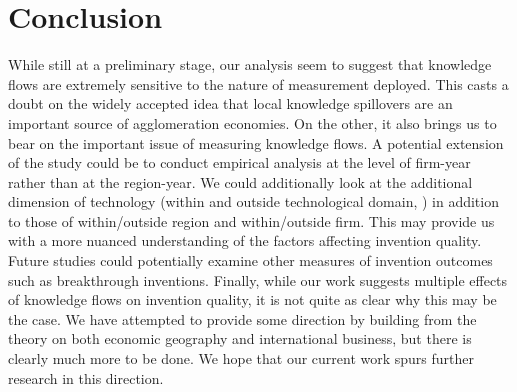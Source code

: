 \documentclass[12pt,letterpaper]{article}
\begin{document}
\section*{Conclusion}
While still at a preliminary stage, our analysis seem to suggest that knowledge flows are extremely sensitive to the nature of measurement deployed. This casts a doubt on the widely accepted idea that local knowledge spillovers are an important source of agglomeration economies. On the other, it also brings us to bear on the important issue of measuring knowledge flows. A potential extension of the study could be to conduct empirical analysis at the level of firm-year rather than at the region-year. We could additionally look at the additional dimension of technology (within and outside technological domain, \cite{Rosenkopf2001}) in addition to those of within/outside region and within/outside firm. This may provide us with a more nuanced understanding of the factors affecting invention quality. Future studies could potentially examine other measures of invention outcomes such as breakthrough inventions. Finally, while our work suggests multiple effects of knowledge flows on invention quality, it is not quite as clear why this may be the case. We have attempted to provide some direction by building from the theory on both economic geography and international business, but there is clearly much more to be done. We hope that our current work spurs further research in this direction.  

\renewcommand{\refname}{REFERENCES}
\singlespacing
 

\newpage
\normalsize
\doublespacing

\appendix
\end{document}
